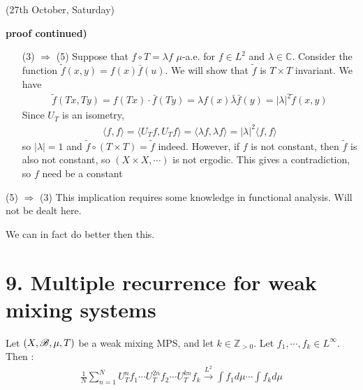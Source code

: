 \documentclass[10pt,a4paper]{report}
\newenvironment{proof}
{\begin{changemargin}{1cm}{0.5cm} 
	}%
	{\end{changemargin}
}
\begin{document}
\newday

(27th October, Saturday)
\s

\begin{proof}
\textbf{proof continued)} \begin{itemize}
\item[(3) $\Rightarrow$ (5)] Suppose that $f\circ T = \lambda f$ $\mu$-a.e. for $f\in L^2$ and $\lambda \in \mathbb{C}$. Consider the function $\tilde{f}(x,y) = f(x)\bar{f}(u)$. We will show that $\tilde{f}$ is $T \times T$ invariant. We have
\begin{align*}
\tilde{f}(Tx,Ty) = f(Tx) \cdot \bar{f}(Ty) = \lambda f(x) \bar{\lambda} \bar{f}(y) = |\lambda|^2 \tilde{f}(x,y)
\end{align*}
Since $U_T$ is an isometry,
\begin{align*}
\langle f, f \rangle = \langle U_T f, U_T f\rangle = \langle \lambda f , \lambda f\rangle = |\lambda|^2 \langle f,f\rangle
\end{align*}
so $|\lambda| =1$ and $\tilde{f} \circ (T \times T) = \tilde{f}$ indeed. However, if $f$ is not constant, then $\tilde{f}$ is also not constant, so $(X\times X, \cdots)$ is not ergodic. This gives a contradiction, so $f$ need be a constant
\end{itemize}
\s

\item[(5) $\Rightarrow$ (3)] This implication requires some knowledge in functional analysis. Will not be dealt here.

\eop
\end{proof}
\s

We can in fact do better then this.
\s

\section*{9. Multiple recurrence for weak mixing systems}

\thm Let $(X,\mathscr{B}, \mu, T)$ be a weak mixing MPS, and let $k\in \mathbb{Z}_{>0}$. Let $f_1,\cdots,f_k \in L^{\infty}$. Then :
\begin{align*}
\frac{1}{N} \sum_{n=1}^N U^n_T f_1 \cdots U^{2n}_T f_2 \cdots U^{kn}_T f_k \xrightarrow{L^2} \int f_1 d\mu \cdots \int f_{k} d\mu
\end{align*}
\s
\end{document}
